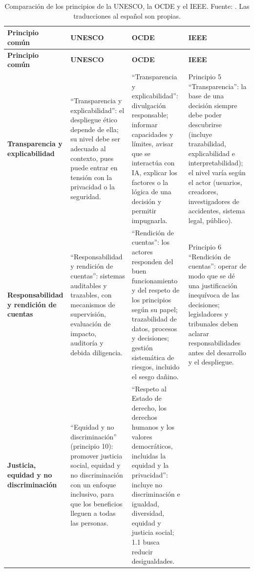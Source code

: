 \documentclass[11pt,letterpaper]{article}
\newlength{\anchocol}
\begin{document}
{\scriptsize
\setlength{\tabcolsep}{4pt}
\renewcommand{\arraystretch}{1.1}
\setlength{\anchocol}{\dimexpr(\linewidth-1.9cm-8\tabcolsep)/3\relax}
\begin{longtable}{@{} >{\raggedright\arraybackslash}p{1.9cm} >{\raggedright\arraybackslash}p{\anchocol} >{\raggedright\arraybackslash}p{\anchocol} >{\raggedright\arraybackslash}p{\anchocol} @{}}
\caption{Comparación de los principios de la UNESCO, la OCDE y el IEEE. Fuente: \cite{unesco2021,oecd2019,ieee2019}. Las traducciones al español son propias.}\label{tab:comparativa}\\
\toprule
\textbf{Principio común} & \textbf{UNESCO} & \textbf{OCDE} & \textbf{IEEE} \\
\midrule
\endfirsthead
\toprule
\textbf{Principio común} & \textbf{UNESCO} & \textbf{OCDE} & \textbf{IEEE} \\
\midrule
\endhead
\textbf{Transparencia y explicabilidad} &
``Transparencia y explicabilidad'': el despliegue ético depende de ella; su nivel debe ser adecuado al contexto, pues puede entrar en tensión con la privacidad o la seguridad. &
1.3 ``Transparencia y explicabilidad'': divulgación responsable; informar capacidades y límites, avisar que se interactúa con IA, explicar los factores o la lógica de una decisión y permitir impugnarla. &
Principio 5 ``Transparencia'': la base de una decisión siempre debe poder descubrirse (incluye trazabilidad, explicabilidad e interpretabilidad); el nivel varía según el actor (usuarios, creadores, investigadores de accidentes, sistema legal, público). \\
\addlinespace
\textbf{Responsabilidad y rendición de cuentas} &
``Responsabilidad y rendición de cuentas'': sistemas auditables y trazables, con mecanismos de supervisión, evaluación de impacto, auditoría y debida diligencia. &
1.5 ``Rendición de cuentas'': los actores responden del buen funcionamiento y del respeto de los principios según su papel; trazabilidad de datos, procesos y decisiones; gestión sistemática de riesgos, incluido el sesgo dañino. &
Principio 6 ``Rendición de cuentas'': operar de modo que se dé una justificación inequívoca de las decisiones; legisladores y tribunales deben aclarar responsabilidades antes del desarrollo y el despliegue. \\
\addlinespace
\textbf{Justicia, equidad y no discriminación} &
``Equidad y no discriminación'' (principio 10): promover justicia social, equidad y no discriminación con un enfoque inclusivo, para que los beneficios lleguen a todas las personas. &
1.2 ``Respeto al Estado de derecho, los derechos humanos y los valores democráticos, incluidas la equidad y la privacidad'': incluye no discriminación e igualdad, diversidad, equidad y justicia social; 1.1 busca reducir desigualdades. &

\end{longtable}}
\end{document}
